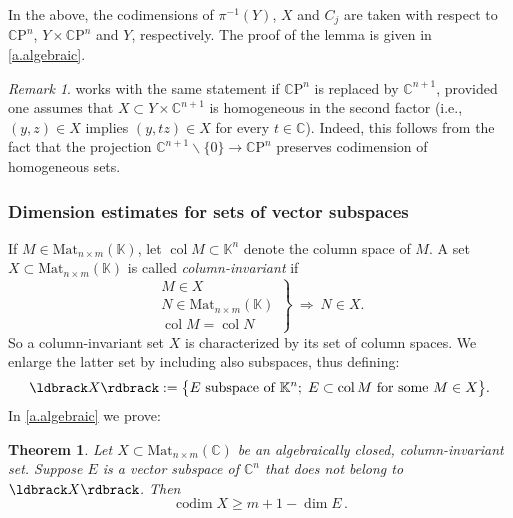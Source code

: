 \documentclass[10pt, a4paper]{amsart}
\theoremstyle{plain}
\newtheorem{thm}[lemma]{Theorem}
\theoremstyle{definition}
\theoremstyle{remark}
\theoremstyle{note}
\newtheorem{rem}[lemma]{Remark}
\numberwithin{equation}{section}
\begin{document}
In the above, the codimensions of $\pi^{-1}(Y)$, $X$ and $C_j$
are taken with respect to ${\mathbb{C}\mathrm{P}}^n$, $Y \times {\mathbb{C}\mathrm{P}}^n$ and $Y$, respectively.
The proof of the lemma is given in \cref{a.algebraic}.

\begin{rem}\label{r.homogeneous}
 works with the same statement if ${\mathbb{C}\mathrm{P}}^{n}$ is replaced by ${\mathbb{C}}^{n+1}$,
provided one assumes that $X \subset Y \times {\mathbb{C}}^{n+1}$ is homogeneous in the second factor
(i.e., $(y,z) \in X$ implies $(y,tz)\in X$ for every $t\in {\mathbb{C}}$).
Indeed, this follows from the fact that the projection ${\mathbb{C}}^{n+1}{\smallsetminus}\{0\} \to {\mathbb{C}\mathrm{P}}^{n}$
preserves codimension of homogeneous sets.
\end{rem}

\subsubsection{Dimension estimates for sets of vector subspaces}\label{sss.sets_of_spaces}

If $M \in {\mathrm{Mat}}_{n \times m}({\mathbb{K}})$, let $\operatorname{col} M \subset {\mathbb{K}}^n$ denote the column space of $M$.
A set $X \subset {\mathrm{Mat}}_{n \times m}({\mathbb{K}})$ is called \emph{column-invariant}
if 
$$
\left.
\begin{array}{c}
M \in X \\ 
N \in {\mathrm{Mat}}_{n \times m}({\mathbb{K}})\\
\operatorname{col} M = \operatorname{col} N
\end{array}
\right\} \ \Rightarrow \ 
N \in X.
$$
So a column-invariant set $X$ is characterized by its set of column spaces.
We enlarge the latter set by including also subspaces, thus defining:
\begin{equation}\label{e.bracket_notation}
\ldbrack X \rdbrack := \big\{ E \text{ subspace of } {\mathbb{K}}^n ; \; E \subset \operatorname{col} M \text{ for some } M \in X \big\}.
\end{equation}
In \cref{a.algebraic} we prove:

\begin{thm}\label{t.schubert}
Let $X \subset {\mathrm{Mat}}_{n \times m}({\mathbb{C}})$ be an algebraically closed, column-invariant set.
Suppose $E$ is a vector subspace of ${\mathbb{C}}^n$
that does not belong to $\ldbrack X \rdbrack$.
Then
$$
\operatorname{codim} X \ge m + 1 - \dim E \, .
$$
\end{thm}
\end{document}
